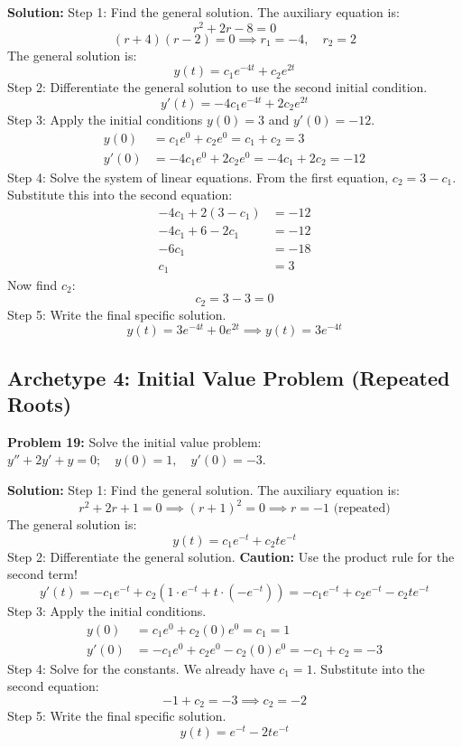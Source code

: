 \documentclass[12pt]{article}
\begin{document}
\textbf{Solution:}
Step 1: Find the general solution. The auxiliary equation is:
\[ r^2 + 2r - 8 = 0 \]
\[ (r + 4)(r - 2) = 0 \implies r_1 = -4, \quad r_2 = 2 \]
The general solution is:
\[ y(t) = c_1 e^{-4t} + c_2 e^{2t} \]
Step 2: Differentiate the general solution to use the second initial condition.
\[ y'(t) = -4c_1 e^{-4t} + 2c_2 e^{2t} \]
Step 3: Apply the initial conditions $y(0) = 3$ and $y'(0) = -12$.
\begin{align*}
    y(0) &= c_1 e^0 + c_2 e^0 = c_1 + c_2 = 3 \\
    y'(0) &= -4c_1 e^0 + 2c_2 e^0 = -4c_1 + 2c_2 = -12
\end{align*}
Step 4: Solve the system of linear equations.
From the first equation, $c_2 = 3 - c_1$. Substitute this into the second equation:
\begin{align*}
    -4c_1 + 2(3 - c_1) &= -12 \\
    -4c_1 + 6 - 2c_1 &= -12 \\
    -6c_1 &= -18 \\
    c_1 &= 3
\end{align*}
Now find $c_2$:
\[ c_2 = 3 - 3 = 0 \]
Step 5: Write the final specific solution.
\[ y(t) = 3 e^{-4t} + 0 e^{2t} \implies y(t) = 3 e^{-4t} \]

\subsection{Archetype 4: Initial Value Problem (Repeated Roots)}
\textbf{Problem 19:} Solve the initial value problem: $y'' + 2y' + y = 0; \quad y(0) = 1, \quad y'(0) = -3$.

\textbf{Solution:}
Step 1: Find the general solution. The auxiliary equation is:
\[ r^2 + 2r + 1 = 0 \implies (r + 1)^2 = 0 \implies r = -1 \text{ (repeated)} \]
The general solution is:
\[ y(t) = c_1 e^{-t} + c_2 t e^{-t} \]
Step 2: Differentiate the general solution. \textbf{Caution:} Use the product rule for the second term!
\[ y'(t) = -c_1 e^{-t} + c_2 \left( 1 \cdot e^{-t} + t \cdot (-e^{-t}) \right) = -c_1 e^{-t} + c_2 e^{-t} - c_2 t e^{-t} \]
Step 3: Apply the initial conditions.
\begin{align*}
    y(0) &= c_1 e^0 + c_2(0)e^0 = c_1 = 1 \\
    y'(0) &= -c_1 e^0 + c_2 e^0 - c_2(0)e^0 = -c_1 + c_2 = -3
\end{align*}
Step 4: Solve for the constants.
We already have $c_1 = 1$. Substitute into the second equation:
\[ -1 + c_2 = -3 \implies c_2 = -2 \]
Step 5: Write the final specific solution.
\[ y(t) = e^{-t} - 2t e^{-t} \]
\end{document}
